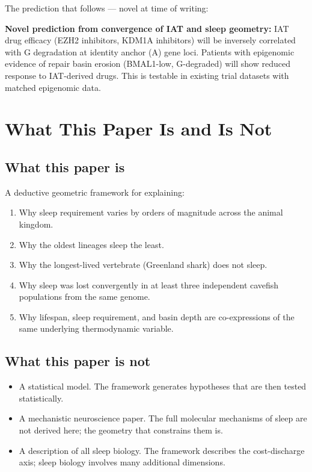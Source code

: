 \documentclass[12pt, a4paper]{article}
\begin{document}
The prediction that follows --- novel at time of writing:

\begin{mdframed}
\textbf{Novel prediction from convergence of IAT and sleep
geometry:} IAT drug efficacy (EZH2 inhibitors, KDM1A
inhibitors) will be inversely correlated with G degradation
at identity anchor (A) gene loci. Patients with epigenomic
evidence of repair basin erosion (BMAL1-low, G-degraded)
will show reduced response to IAT-derived drugs. This is
testable in existing trial datasets with matched epigenomic
data.
\end{mdframed}

\section{What This Paper Is and Is Not}
\label{sec:scope}

\subsection{What this paper is}

A deductive geometric framework for explaining:
\begin{enumerate}
    \item Why sleep requirement varies by orders of
          magnitude across the animal kingdom.
    \item Why the oldest lineages sleep the least.
    \item Why the longest-lived vertebrate (Greenland
          shark) does not sleep.
    \item Why sleep was lost convergently in at least three
          independent cavefish populations from the same
          genome.
    \item Why lifespan, sleep requirement, and basin depth
          are co-expressions of the same underlying
          thermodynamic variable.
\end{enumerate}

\subsection{What this paper is not}

\begin{itemize}
    \item A statistical model. The framework generates
          hypotheses that are then tested statistically.
    \item A mechanistic neuroscience paper. The full
          molecular mechanisms of sleep are not derived
          here; the geometry that constrains them is.
    \item A description of all sleep biology. The framework
          describes the cost-discharge axis; sleep biology
          involves many additional dimensions.
\end{itemize}
\end{document}
